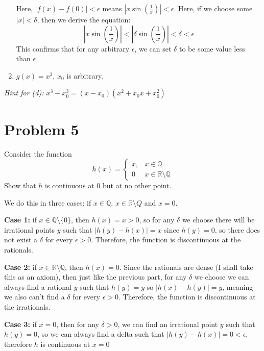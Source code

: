\documentclass[10pt]{article}
\begin{document}
\begin{enumerate}[label=\alph*)]
			\begin{solution}
				Here, $|f(x) - f(0)| < \epsilon$ means $|x \sin (\frac{1}{x})| < \epsilon$. Here, if we choose 
				some
				$|x| < \delta$, then we derive the equation:
				\[
				\left|x \sin \left( \frac{1}{x} \right) \right| < \left|\delta \sin(\frac{1}{x})\right| <
				\delta < \epsilon
				\] 
				This confirms that for any arbitrary $\epsilon$, we can set $\delta$ to be some value less than
				$\epsilon$
			\end{solution}
		\item $g(x) = x^3$, $x_0$ is arbitrary. 
	\end{enumerate}
	\textit{Hint for (d): $x^3 - x_0^3 = (x - x_0)(x^2 + x_0x + x_0^2)$}
	\pagebreak
	\section*{Problem 5}
	Consider the function 
	\[
	h(x) = \begin{cases}
		x, & x \in \mathbb Q\\
		0 & x \in \mathbb R \setminus \mathbb Q 
	\end{cases}
	\] 
	Show that $h$ is continuous at 0 but at no other point.

	\begin{solution}
		We do this in three cases: if $x \in \mathbb Q$, $x \in \mathbb R \setminus Q$ and $x = 0$.

		\textbf{Case 1:} if $x \in \mathbb Q \setminus \{ 0\} $, then $h(x) = x > 0$, so for any $\delta$ we
		choose there will be
		irrational points $y$ such that $|h(y) - h(x)| = x$ since $h(y) = 0$, so there does not exist a $\delta$ 
		for every $\epsilon > 0$. Therefore, the function is discontinuous at the rationals.

		\textbf{Case 2:} if $x \in \mathbb R \setminus \mathbb Q$, then $h(x) = 0$. Since the rationals are dense
		(I shall take this as an axiom), then just like the previous part, for any $\delta$ we choose we can 
		always find a rational $y$ such that $h(y) = y$ so $|h(x) - h(y)| = y$, meaning we also can't find a 
		$\delta$ for every $\epsilon > 0$. Therefore, the function is discontinuous at the irrationals.

		\textbf{Case 3:} if $x = 0$, then for any $\delta > 0$, we can find an irrational point $y$ such that
		$h(y) = 0$, so we can always find a delta such that $|h(y) - h(x)| = 0 < \epsilon$, therefore $h$ is 
		continuous at $x = 0$
	\end{solution}
\end{document}
